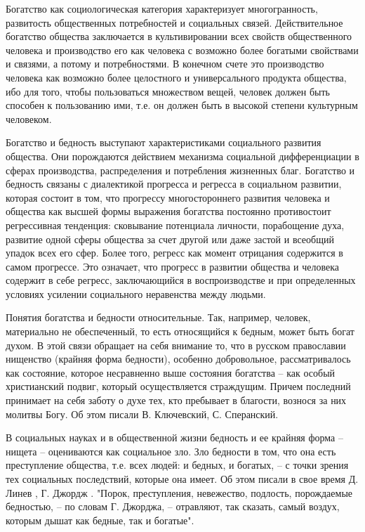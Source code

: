 Богатство как социологическая категория характеризует многогранность, 
развитость общественных потребностей и социальных связей. Действительное 
богатство общества заключается в культивировании всех свойств общественного 
человека и производство его как человека с возможно более богатыми свойствами 
и связями, а потому и потребностями. В конечном счете это производство 
человека как возможно более целостного и универсального продукта общества, 
ибо для того, чтобы пользоваться множеством вещей, человек должен быть 
способен к пользованию ими, т.е. он должен быть в высокой степени культурным 
человеком\cite{volch_s3}.

Богатство и бедность выступают характеристиками социального развития общества. 
Они порождаются действием механизма социальной дифференциации в сферах 
производства, распределения и потребления жизненных благ. Богатство и бедность 
связаны с диалектикой прогресса и регресса в социальном развитии, которая 
состоит в том, что прогрессу многостороннего развития человека и общества 
как высшей формы выражения богатства постоянно противостоит регрессивная 
тенденция: сковывание потенциала личности, порабощение духа, развитие одной 
сферы общества за счет другой или даже застой и всеобщий упадок всех его 
сфер. Более того, регресс как момент отрицания содержится в самом прогрессе. 
Это означает, что прогресс в развитии общества и человека содержит в себе 
регресс, заключающийся в воспроизводстве и при определенных условиях усилении 
социального неравенства между людьми.

Понятия богатства и бедности относительные. Так, например, человек, 
материально не обеспеченный, то есть относящийся к бедным, может быть богат 
духом. В этой связи обращает на себя внимание то, что в русском православии 
нищенство (крайняя форма бедности), особенно добровольное, рассматривалось 
как состояние, которое несравненно выше состояния богатства -- как особый 
христианский подвиг, который осуществляется страждущим. Причем последний 
принимает на себя заботу о духе тех, кто пребывает в благости, вознося за 
них молитвы Богу. Об этом писали В. Ключевский, С. Сперанский\cite{volch_s4}.

В социальных науках и в общественной жизни бедность и ее крайняя форма -- 
нищета -- оцениваются как социальное зло. Зло бедности в том, что она есть 
преступление общества, т.е. всех людей: и бедных, и богатых, -- с точки зрения 
тех социальных последствий, которые она имеет. Об этом писали в свое время 
Д. Линев \cite{volch_s5}, Г. Джордж \cite{volch_s6}. "Порок, преступления, 
невежество, подлость, порождаемые бедностью, -- по словам Г. Джорджа, -- 
отравляют, так сказать, самый воздух, которым дышат как бедные, так и богатые".


